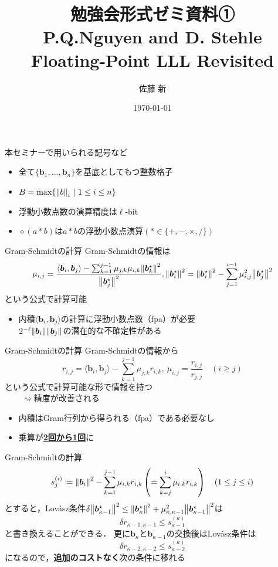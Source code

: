 \documentclass[12pt,aspectratio=169,xcolor=dvipsnames,table,dvipdfmx, leqno]{beamer}
\title[勉強会]{勉強会形式ゼミ資料①\\P.Q.Nguyen and D. Stehle Floating-Point LLL Revisited}
\author[佐藤]{佐藤 新}
\date{\today}
\begin{document}
\maketitle

\begin{frame}
    本セミナーで用いられる記号など
    \begin{itemize}
        \item 全て$\{\bm{b}_1,\ldots,\bm{b}_n\}$を基底としてもつ整数格子
        \item $B=\max\{\norm{b}_i~|~1\le i\le n\}$
        \item 浮動小数点数の演算精度は$\ell$-bit
        \item $\diamond(a*b)$は$a*b$の浮動小数点演算$(*\in\{+, -, \times, /\})$
    \end{itemize}
\end{frame}

\begin{frame}{Gram-Schmidtの計算}
    Gram-Schmidtの情報は
    \[
    \mu_{i, j}=\frac{\langle \bm{b}_i, \bm{b}_j\rangle-\sum_{k=1}^{j-1}\mu_{j, k}\mu_{i, k}\norm{\bm{b}_k^\star}^2}{\norm{\bm{b}_j^\star}^2}, \norm{\bm{b}_i^\star}^2=\norm{\bm{b}_i^\star}^2-\sum_{j=1}^{i-1}\mu_{i, j}^2\norm{\bm{b}_j^\star}^2
    \]
    という公式で計算可能

    \begin{itemize}
        \item 内積$\langle \bm{b}_i, \bm{b}_j\rangle$の計算に浮動小数点数（fpa）が必要\\
        \quad\quad $2^{-\ell}\norm{\bm{b}_i}\norm{\bm{b}_j}$の潜在的な不確定性がある
    \end{itemize}
\end{frame}

\begin{frame}{Gram-Schmidtの計算}
    Gram-Schmidtの情報から
    \[
    r_{i, j}=\langle \bm{b}_i, \bm{b}_j\rangle-\sum_{k=1}^{j-1}\mu_{j, k}r_{i, k},~\mu_{i, j}=\frac{r_{i, j}}{r_{j, j}}\quad(i\ge j)
    \]
    という公式で計算可能な形で情報を持つ\\
    $\quad\quad\rightsquigarrow$精度が改善される
    \begin{itemize}
        \item 内積はGram行列から得られる（fpa）である必要なし
        \item 乗算が\underline{\textbf{2回から1回}}に
    \end{itemize}
\end{frame}

\begin{frame}{Gram-Schmidtの計算}
\[
s_j^{(i)}\coloneqq \norm{\bm{b}_i}^2-\sum_{k=1}^{j-1}\mu_{i, k}r_{i, k}\left(=\sum_{k=j}^i\mu_{i, k}r_{i, k}\right)\quad(1\le j\le i)
\]
とすると，Lov\'asz条件$\delta\norm{\bm{b}_{\kappa-1}^\star}^2\le \norm{\bm{b}_\kappa^\star}^2+\mu_{\kappa, \kappa-1}^2\norm{\bm{b}_{\kappa-1}^\star}^2$は
\[
\delta r_{\kappa-1, \kappa-1}\le s_{\kappa-1}^{(\kappa)}
\]
と書き換えることができる．
更に$\bm{b}_{\kappa}$と$\bm{b}_{\kappa-1}$の交換後はLov\'asz条件は
\[
\delta r_{\kappa-2, \kappa-2}\le s_{\kappa-2}^{(\kappa)}
\]
になるので，\textbf{追加のコストなく}次の条件に移れる
\end{frame}
\end{document}
